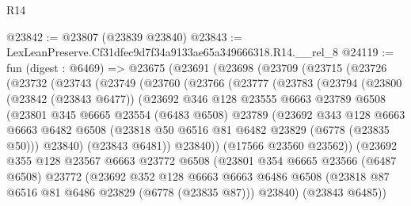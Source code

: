 \begin{lexlean}{R14}
\begin{coremodule}
@23842 := @23807 (@23839 @23840)
@23843 := LexLeanPreserve.Cf31dfec9d7f34a9133ae65a349666318.R14.__rel_8
@24119 := fun (digest : @6469) =>
  @23675
    (@23691
      (@23698
        (@23709
          (@23715
            (@23726
              (@23732
                (@23743
                  (@23749
                    (@23760
                      (@23766
                        (@23777
                          (@23783
                            (@23794
                              (@23800
                                (@23842 (@23843 @6477))
                                (@23692
                                  @346
                                  @128
                                  @23555
                                  @6663
                                  @23789
                                  @6508
                                  (@23801
                                    @345
                                    @6665
                                    @23554
                                    (@6483 @6508)
                                    @23789
                                    (@23692
                                      @343
                                      @128
                                      @6663
                                      @6663
                                      @6482
                                      @6508
                                      (@23818 @50 @6516 @81 @6482 @23829 (@6778 (@23835 @50)))
                                      @23840)
                                    (@23843 @6481))
                                  @23840))
                              (@17566 @23560 @23562))
                            (@23692
                              @355
                              @128
                              @23567
                              @6663
                              @23772
                              @6508
                              (@23801
                                @354
                                @6665
                                @23566
                                (@6487 @6508)
                                @23772
                                (@23692
                                  @352
                                  @128
                                  @6663
                                  @6663
                                  @6486
                                  @6508
                                  (@23818 @87 @6516 @81 @6486 @23829 (@6778 (@23835 @87)))
                                  @23840)
                                (@23843 @6485))

\end{coremodule}
\end{lexlean}
